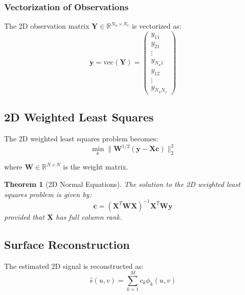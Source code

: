 \documentclass[12pt]{article}
\renewcommand{\vec}[1]{\mathbf{#1}}
\newtheorem{theorem}{Theorem}[section]
\begin{document}

\subsubsection{Vectorization of Observations}

The 2D observation matrix $\mathbf{Y} \in \mathbb{R}^{N_u \times N_v}$ is vectorized as:
\begin{equation}
    \vec{y} = \text{vec}(\mathbf{Y}) = \begin{pmatrix}
        y_{11} \\ y_{21} \\ \vdots \\ y_{N_u 1} \\ y_{12} \\ \vdots \\ y_{N_u N_v}
    \end{pmatrix}
\end{equation}

\subsection{2D Weighted Least Squares}

The 2D weighted least squares problem becomes:
\begin{equation}
    \min_{\vec{c}} \|\mathbf{W}^{1/2}(\vec{y} - \mathbf{X}\vec{c})\|_2^2
\end{equation}

where $\mathbf{W} \in \mathbb{R}^{N \times N}$ is the weight matrix.

\begin{theorem}[2D Normal Equations]
    The solution to the 2D weighted least squares problem is given by:
    \begin{equation}
        \vec{c} = (\mathbf{X}^T \mathbf{W} \mathbf{X})^{-1} \mathbf{X}^T \mathbf{W} \vec{y}
    \end{equation}
    provided that $\mathbf{X}$ has full column rank.
\end{theorem}

\subsection{Surface Reconstruction}

The estimated 2D signal is reconstructed as:
\begin{equation}
    \hat{s}(u, v) = \sum_{k=1}^M c_k \phi_k(u, v)
\end{equation}
\end{document}
